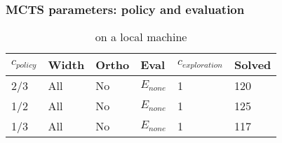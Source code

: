 \documentclass[runningheads,a4paper,draft]{svjour3}
\newcommand{\ra}[1]{\renewcommand{\arraystretch}{#1}}
\begin{document}
%
%
%

\subsubsection{MCTS parameters: policy and evaluation}

\begin{table}[ht]
\centering\ra{1.3}
\small
\begin{tabular}{llllll}
\toprule
 $c_{policy}$ & Width & Ortho & Eval & $c_{exploration}$ & Solved \\
\midrule
 2/3 & All & No & $E_{none}$ & 1 & 120\\
 1/2 & All & No & $E_{none}$ & 1 & 125\\
 1/3 & All & No & $E_{none}$ & 1 & 117\\
\bottomrule
\end{tabular}
\caption{\label{tab:cost_param} on a local machine}
\end{table}
\end{document}
